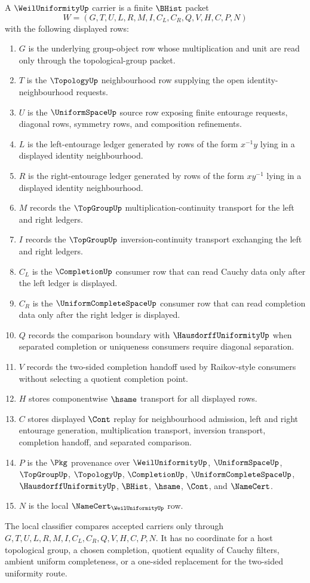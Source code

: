 \begin{definition}
\label{def:weil-uniformity-carrier}
A $\WeilUniformityUp$ carrier is a finite $\BHist$ packet
$$
W=(G,T,U,L,R,M,I,C_L,C_R,Q,V,H,C,P,N)
$$
with the following displayed rows:
\begin{enumerate}
\item $G$ is the underlying group-object row whose multiplication and unit are read only through the topological-group packet.
\item $T$ is the $\TopologyUp$ neighbourhood row supplying the open identity-neighbourhood requests.
\item $U$ is the $\UniformSpaceUp$ source row exposing finite entourage requests, diagonal rows, symmetry rows, and composition refinements.
\item $L$ is the left-entourage ledger generated by rows of the form $x^{-1}y$ lying in a displayed identity neighbourhood.
\item $R$ is the right-entourage ledger generated by rows of the form $xy^{-1}$ lying in a displayed identity neighbourhood.
\item $M$ records the $\TopGroupUp$ multiplication-continuity transport for the left and right ledgers.
\item $I$ records the $\TopGroupUp$ inversion-continuity transport exchanging the left and right ledgers.
\item $C_L$ is the $\CompletionUp$ consumer row that can read Cauchy data only after the left ledger is displayed.
\item $C_R$ is the $\UniformCompleteSpaceUp$ consumer row that can read completion data only after the right ledger is displayed.
\item $Q$ records the comparison boundary with $\HausdorffUniformityUp$ when separated completion or uniqueness consumers require diagonal separation.
\item $V$ records the two-sided completion handoff used by Raikov-style consumers without selecting a quotient completion point.
\item $H$ stores componentwise $\hsame$ transport for all displayed rows.
\item $C$ stores displayed $\Cont$ replay for neighbourhood admission, left and right entourage generation, multiplication transport, inversion transport, completion handoff, and separated comparison.
\item $P$ is the $\Pkg$ provenance over $\WeilUniformityUp$, $\UniformSpaceUp$, $\TopGroupUp$, $\TopologyUp$, $\CompletionUp$, $\UniformCompleteSpaceUp$, $\HausdorffUniformityUp$, $\BHist$, $\hsame$, $\Cont$, and $\NameCert$.
\item $N$ is the local $\NameCert_{\WeilUniformityUp}$ row.
\end{enumerate}
The local classifier compares accepted carriers only through $G,T,U,L,R,M,I,C_L,C_R,Q,V,H,C,P,N$. It has no coordinate for a host topological group, a chosen completion, quotient equality of Cauchy filters, ambient uniform completeness, or a one-sided replacement for the two-sided uniformity route.
\end{definition}

